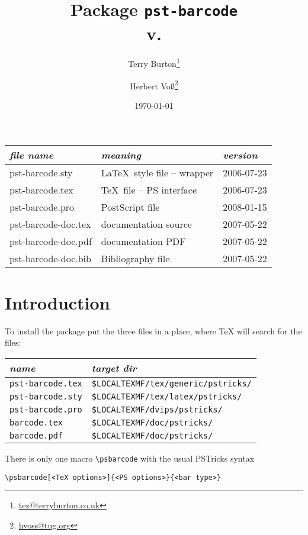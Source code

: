 \documentclass{article}
\title{Package \texttt{pst-barcode}\\
\footnotesize v. \PSTfileversion}
\author{Terry Burton\thanks{\protect\url{tez@terryburton.co.uk}}
 \and Herbert Vo\ss\thanks{\protect\url{hvoss@tug.org}}}
\date{\today}
\begin{document}
\maketitle


\begin{center}
\begin{tabular}{@{}>{\ttfamily}lll@{}}
\textrm{\emph{file name}} & \emph{meaning} & \emph{version}\\\hline 
pst-barcode.sty & \LaTeX\ style file -- wrapper & 2006-07-23\\
pst-barcode.tex & \TeX\ file -- PS interface & 2006-07-23\\
pst-barcode.pro & PostScript file & 2008-01-15\\
pst-barcode-doc.tex & documentation source & 2007-05-22\\
pst-barcode-doc.pdf & documentation PDF & 2007-05-22\\
pst-barcode-doc.bib & Bibliography file & 2007-05-22
\end{tabular}
\end{center}



\clearpage
\tableofcontents

\clearpage
\section{Introduction}
To install the package put the three files in a place, where \TeX{} will search
for the files:

\bigskip\noindent
\begin{tabular}{@{}ll@{}}
\emph{name} & \emph{target dir} \\\hline
\verb+pst-barcode.tex+ & \verb+$LOCALTEXMF/tex/generic/pstricks/+\\
\verb+pst-barcode.sty+ & \verb+$LOCALTEXMF/tex/latex/pstricks/+\\
\verb+pst-barcode.pro+ & \verb+$LOCALTEXMF/dvips/pstricks/+ \\
\verb+barcode.tex+ & \verb+$LOCALTEXMF/doc/pstricks/+\\
\verb+barcode.pdf+ & \verb+$LOCALTEXMF/doc/pstricks/+ %
\end{tabular}

\bigskip
There is only one macro \verb+\psbarcode+ with the usual PSTricks syntax
\begin{verbatim}
\psbarcode[<TeX options>]{<PS options>}{<bar type>}
\end{verbatim}
\end{document}
